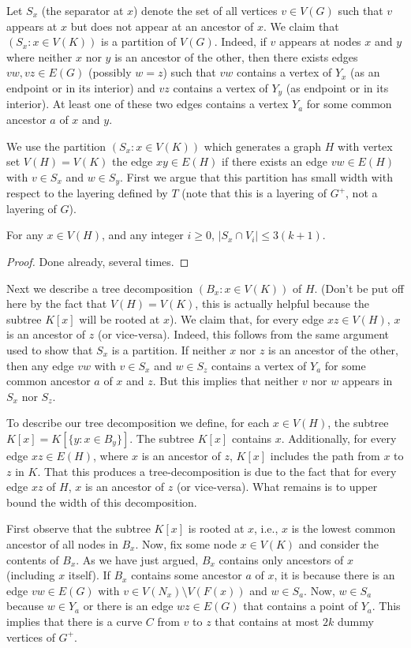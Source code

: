 \documentclass{patmorin}
\begin{document}
Let $S_x$ (the separator at $x$) denote the set of all vertices $v\in V(G)$ such that $v$ appears at $x$ but does not appear at an ancestor of $x$.  We claim that $(S_x:x\in V(K))$ is a partition of $V(G)$. Indeed, if $v$ appears at nodes $x$ and $y$ where neither $x$ nor $y$ is an ancestor of the other, then there exists edges $vw,vz\in E(G)$ (possibly $w=z$) such that $vw$ contains a vertex of $Y_x$ (as an endpoint or in its interior) and $vz$ contains a vertex of $Y_y$ (as endpoint or in its interior).  At least one of these two edges contains a vertex $Y_a$ for some common ancestor $a$ of $x$ and $y$.

We use the partition $(S_x: x\in V(K))$ which generates a graph $H$ with vertex set $V(H)=V(K)$ the edge $xy\in E(H)$ if there exists an edge $vw\in E(H)$ with $v\in S_x$ and $w\in S_y$.
First we argue that this partition has small width with respect to the layering defined by $T$ (note that this is a layering of $G^+$, not a layering of $G$).

\begin{clm}
  For any $x\in V(H)$, and any integer $i\ge 0$, $|S_x\cap V_i|\le 3(k+1)$.
\end{clm}

\begin{proof}
  Done already, several times.
\end{proof}

Next we describe a tree decomposition $(B_x:x\in V(K))$ of $H$.  (Don't be put off here by the fact that $V(H)=V(K)$, this is actually helpful because the subtree $K[x]$ will be rooted at $x$).  We claim that, for every edge $xz\in V(H)$, $x$ is an ancestor of $z$ (or vice-versa).  Indeed, this follows from the same argument used to show that $S_x$ is a partition.  If neither $x$ nor $z$ is an ancestor of the other, then any edge $vw$ with $v\in S_x$ and $w\in S_z$ contains a vertex of $Y_a$ for some common ancestor $a$ of $x$ and $z$. But this implies that neither $v$ nor $w$ appears in $S_x$ nor $S_z$.

To describe our tree decomposition we define, for each $x\in V(H)$, the subtree $K[x]=K[\{y:x\in B_y\}]$.  The subtree $K[x]$ contains $x$.  Additionally, for every edge $xz\in E(H)$, where $x$ is an ancestor of $z$, $K[x]$ includes the path from $x$ to $z$ in $K$.  That this produces a tree-decomposition is due to the fact that for every edge $xz$ of $H$, $x$ is an ancestor of $z$ (or vice-versa).  What remains is to upper bound the width of this decomposition.

First observe that the subtree $K[x]$ is rooted at $x$, i.e., $x$ is the lowest common ancestor of all nodes in $B_x$.  Now, fix some node $x\in V(K)$ and consider the contents of $B_x$.  As we have just argued, $B_x$ contains only ancestors of $x$ (including $x$ itself). If $B_x$ contains some ancestor $a$ of $x$, it is because there is an edge $vw\in E(G)$ with $v\in V(N_x)\setminus V(F(x))$ and $w\in S_a$.  Now, $w\in S_a$ because $w\in Y_a$ or there is an edge $wz\in E(G)$ that contains a point of $Y_a$.  This implies that there is a curve $C$ from $v$ to $z$ that contains at most $2k$ dummy  vertices of $G^+$.
\end{document}
